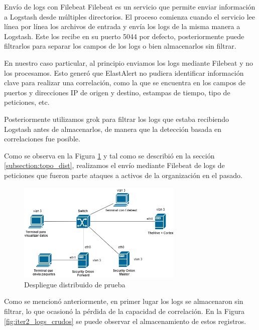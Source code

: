     \begin{section}{Envío de logs con Filebeat}
    Filebeat es un servicio que permite enviar información a Logstash desde múltiples directorios. El proceso comienza cuando el servicio lee línea por línea los archivos de entrada y envía los logs de la misma manera a Logstash. Este los recibe en su puerto 5044 por defecto, posteriormente puede filtrarlos para separar los campos de los logs o bien almacenarlos sin filtrar. \par
    En nuestro caso particular, al principio enviamos los logs mediante Filebeat y no los procesamos. Esto generó que ElastAlert no pudiera identificar información clave para realizar una correlación, como la que se encuentra en los campos de puertos y direcciones IP de origen y destino, estampas de tiempo, tipo de peticiones, etc. \par
    Posteriormente utilizamos grok para filtrar los logs que estaba recibiendo Logstash antes de almacenarlos, de manera que la detección basada en correlaciones fue posible.\par
    Como se observa en la Figura \ref{fig:iter2_despl_dist} y tal como se describió en la sección \ref{subsection:topo_dist}, realizamos el envío mediante Filebeat de logs de peticiones que fueron parte ataques a activos de la organización en el pasado. 
    \begin{figure}[H]
    \centering
        \includegraphics[width=0.7\textwidth]{./iteracion_1_imagenes/figura_33_c_topologia_de_prueba_3.png}
        \caption{Despliegue distribuido de prueba}
        \label{fig:iter2_despl_dist}
    \end{figure}
    \FloatBarrier
    Como se mencionó anteriormente, en primer lugar los logs se almacenaron sin filtrar, lo que ocasionó la pérdida de la capacidad de correlación. En la Figura \ref{fig:iter2_logs_crudos} se puede observar el almacenamiento de estos registros.
    \begin{figure}[H]

\end{figure}
\end{section}
